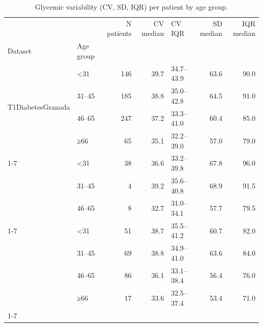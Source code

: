 \begin{table}
\caption{Glycemic variability (CV, SD, IQR) per patient by age group.}
\label{tab:variability_age}
\begin{tabular}{llrrlrr}
\toprule
 &  & N patients & CV median & CV IQR & SD median & IQR median \\
Dataset & Age group &  &  &  &  &  \\
\midrule
\multirow[t]{4}{*}{T1DiabetesGranada} & <31 & 146 & 39.7 & 34.7–43.9 & 63.6 & 90.0 \\
 & 31–45 & 185 & 38.8 & 35.0–42.8 & 64.5 & 91.0 \\
 & 46–65 & 247 & 37.2 & 33.3–41.0 & 60.4 & 85.0 \\
 & ≥66 & 65 & 35.1 & 32.2–39.0 & 57.0 & 79.0 \\
\cline{1-7}
\multirow[t]{3}{*}{DiaTrend} & <31 & 38 & 36.6 & 33.2–39.8 & 67.8 & 96.0 \\
 & 31–45 & 4 & 39.2 & 35.6–40.8 & 68.9 & 91.5 \\
 & 46–65 & 8 & 32.7 & 31.0–34.1 & 57.7 & 79.5 \\
\cline{1-7}
\multirow[t]{4}{*}{ReplaceBG} & <31 & 51 & 38.7 & 35.5–41.2 & 60.7 & 82.0 \\
 & 31–45 & 69 & 38.8 & 34.9–41.0 & 63.6 & 84.0 \\
 & 46–65 & 86 & 36.1 & 33.1–38.4 & 56.4 & 76.0 \\
 & ≥66 & 17 & 33.6 & 32.5–37.4 & 53.4 & 71.0 \\
\cline{1-7}
\bottomrule
\end{tabular}
\end{table}
